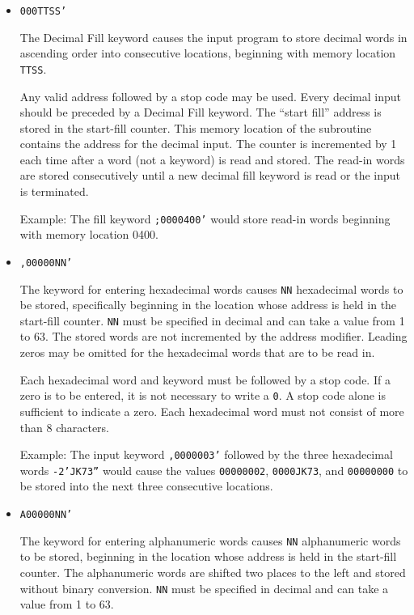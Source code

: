 \begin{itemize}
\item \texttt{000TTSS'}

The Decimal Fill keyword causes the input program to store decimal words in ascending order into consecutive locations, beginning with memory location \texttt{TTSS}.

Any valid address followed by a stop code may be used. Every decimal input should be preceded by a Decimal Fill keyword. The ``start fill'' address is stored in the start-fill counter. This memory location of the subroutine contains the address for the decimal input. The counter is incremented by 1 each time after a word (not a keyword) is read and stored. The read-in words are stored consecutively until a new decimal fill keyword is read or the input is terminated.

Example: The fill keyword \texttt{;0000400'} would store read-in words beginning with memory location 0400.

\item \texttt{,00000NN'}

The keyword for entering hexadecimal words causes \texttt{NN} hexadecimal words to be stored, specifically beginning in the location whose address is held in the start-fill counter. \texttt{NN} must be specified in decimal and can take a value from 1 to 63. The stored words are not incremented by the address modifier. Leading zeros may be omitted for the hexadecimal words that are to be read in.

Each hexadecimal word and keyword must be followed by a stop code. If a zero is to be entered, it is not necessary to write a \texttt{0}. A stop code alone is sufficient to indicate a zero. Each hexadecimal word must not consist of more than 8 characters.

Example: The input keyword \texttt{,0000003'} followed by the three hexadecimal words \texttt{-2'JK73''} would cause the values \texttt{00000002}, \texttt{0000JK73}, and \texttt{00000000} to be stored into the next three consecutive locations.

\item \texttt{A00000NN'}

The keyword for entering alphanumeric words causes \texttt{NN} alphanumeric words to be stored, beginning in the location whose address is held in the start-fill counter. The alphanumeric words are shifted two places to the left and stored without binary conversion. \texttt{NN} must be specified in decimal and can take a value from 1 to 63.


\end{itemize}

